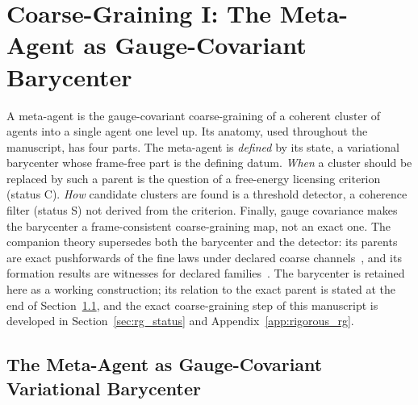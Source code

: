 \section{Coarse-Graining I: The Meta-Agent as Gauge-Covariant Barycenter}\label{sec:meta_agent_formation}

A meta-agent is the gauge-covariant coarse-graining of a coherent cluster of agents into a single agent one level up. Its anatomy, used throughout the manuscript, has four parts. The meta-agent is \emph{defined} by its state, a variational barycenter whose frame-free part is the defining datum. \emph{When} a cluster should be replaced by such a parent is the question of a free-energy licensing criterion (status C). \emph{How} candidate clusters are found is a threshold detector, a coherence filter (status S) not derived from the criterion. Finally, gauge covariance makes the barycenter a frame-consistent coarse-graining map, not an exact one. The companion theory supersedes both the barycenter and the detector: its parents are exact pushforwards of the fine laws under declared coarse channels~\cite[Chs.~9 and~11]{DennisGaugeVFE2026}, and its formation results are witnesses for declared families~\cite[Ch.~13]{DennisGaugeVFE2026}. The barycenter is retained here as a working construction; its relation to the exact parent is stated at the end of Section~\ref{sec:meta_agent_definition}, and the exact coarse-graining step of this manuscript is developed in Section~\ref{sec:rg_status} and Appendix~\ref{app:rigorous_rg}.

\subsection{The Meta-Agent as Gauge-Covariant Variational Barycenter}
\label{sec:meta_agent_definition}


